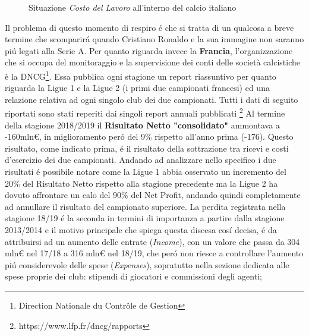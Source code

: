 \documentclass[
    corpo=12pt,
    oneside,
    evenboxes,
    tipotesi=triennale,
    stile=classica,
    oldstyle,
    autoretitolo,
    greek,
]{toptesi}
\begin{document}
\begin{interlinea}{1.5}
\begin{figure}
    \caption{Situazione \emph{Costo del Lavoro} all'interno del calcio italiano}
    \label{wage_serieA}  
\end{figure}
Il problema di questo momento di respiro \'e che si tratta di un qualcosa a breve termine che scomparir\'a quando Cristiano Ronaldo e la 
sua immagine non saranno pi\'u legati alla Serie A.\newpage
Per quanto riguarda invece la \textbf{Francia}, l'organizzazione che si occupa del monitoraggio e la supervisione dei conti 
delle società calcistiche è la DNCG\footnote{Direction Nationale du Contrôle de Gestion}. Essa 
pubblica ogni stagione un report riassuntivo per quanto riguarda la Ligue 1 e la Ligue 2 (i primi due campionati francesi) ed una
relazione relativa ad ogni singolo club dei due campionati. Tutti i dati di seguito riportati sono stati reperiti dai singoli
report annuali pubblicati \footnote{https://www.lfp.fr/dncg/rapports} \newline
Al termine della stagione 2018/2019 il \textbf{Risultato Netto "consolidato"} ammontava a -160mln€, in miglioramento per\'o del 9\% rispetto 
all'anno prima (-176). Questo risultato, come indicato prima, \'e il risultato della sottrazione tra ricevi e costi d'esercizio
dei due campionati. Andando ad analizzare nello specifico i due risultati \'e possibile notare come la Ligue 1 abbia 
osservato un incremento del 20\% del Risultato Netto rispetto alla stagione precedente ma la Ligue 2 ha 
dovuto affrontare un calo del 90\% del Net Profit, andando quindi completamente ad annullare il risultato del 
campionato superiore. 
La perdita registrata nella stagione 18/19 \'e la seconda in termini di importanza a partire dalla stagione 2013/2014 e
il motivo principale che spiega questa discesa cos\'i decisa, \'e da attribuirsi ad un aumento delle entrate (\emph{Income}),
con un valore che passa da 304 mln€ nel 17/18 a 316 mln€ nel 18/19, che per\'o non riesce a controllare l'aumento pi\'u considerevole
delle spese (\emph{Expenses}), sopratutto nella sezione dedicata alle spese proprie dei club: stipendi di giocatori e commissioni degli agenti; 

\end{interlinea}
\end{document}
